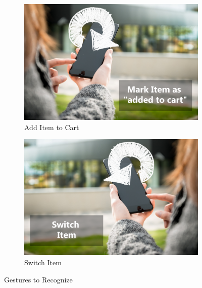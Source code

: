 \begin{figure}[h]
\captionsetup{justification=centering}
\begin{subfigure}{0.475\textwidth}
\includegraphics[width=\textwidth]{res/gestures/addToCart.png}
\caption{Add Item to Cart}
\label{fig:gestureAdd}
\end{subfigure} \hspace{0.05\textwidth}
\begin{subfigure}{0.475\textwidth}
\includegraphics[width=\textwidth]{res/gestures/removeFromCart.png}
\caption{Switch Item}
\label{fig:gestureRemove}
\end{subfigure}
\caption{Gestures to Recognize}
\label{fig:gesturesToRecognize}
\end{figure}